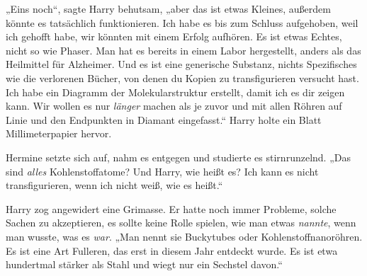 „Eins noch“, sagte Harry behutsam, „aber das ist etwas Kleines, außerdem könnte es tatsächlich funktionieren. Ich habe es bis zum Schluss aufgehoben, weil ich gehofft habe, wir könnten mit einem Erfolg aufhören. Es ist etwas Echtes, nicht so wie Phaser. Man hat es bereits in einem Labor hergestellt, anders als das Heilmittel für Alzheimer. Und es ist eine generische Substanz, nichts Spezifisches wie die verlorenen Bücher, von denen du Kopien zu transfigurieren versucht hast. Ich habe ein Diagramm der Molekularstruktur erstellt, damit ich es dir zeigen kann. Wir wollen es nur \emph{länger} machen als je zuvor und mit allen Röhren auf Linie und den Endpunkten in Diamant eingefasst.“ Harry holte ein Blatt Millimeterpapier hervor.

Hermine setzte sich auf, nahm es entgegen und studierte es stirnrunzelnd.
„Das sind \emph{alles} Kohlenstoffatome? Und Harry, wie heißt es? Ich kann es nicht transfigurieren, wenn ich nicht weiß, wie es heißt.“

Harry zog angewidert eine Grimasse. Er hatte noch immer Probleme, solche Sachen zu akzeptieren, es sollte keine Rolle spielen, wie man etwas \emph{nannte}, wenn man wusste, was es \emph{war}.
„Man nennt sie Buckytubes oder Kohlenstoffnanoröhren. Es ist eine Art Fulleren, das erst in diesem Jahr entdeckt wurde. Es ist etwa hundertmal stärker als Stahl und wiegt nur ein Sechstel davon.“

